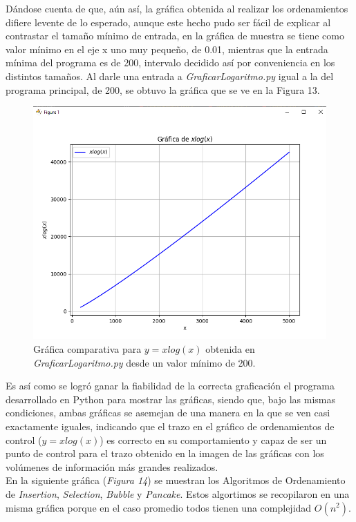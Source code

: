 \documentclass[a4paper,12pt]{article}
\begin{document}
Dándose cuenta de que, aún así, la gráfica obtenida al realizar los ordenamientos difiere levente de lo esperado, aunque este hecho pudo ser fácil de explicar al contrastar el tamaño mínimo de entrada, en la gráfica de muestra se tiene como valor mínimo en el eje x uno muy pequeño, de 0.01, mientras que la entrada mínima del programa es de 200, intervalo decidido así por conveniencia en los distintos tamaños. Al darle una entrada a \textit{GraficarLogaritmo.py} igual a la del programa principal, de 200, se obtuvo la gráfica que se ve en la Figura 13.

\begin{figure}[h]
    \centering
    \includegraphics[width=.8\textwidth]{media/xlogx_desde_200.png}
    \caption{Gráfica comparativa para $y=xlog(x)$ obtenida en \textit{GraficarLogaritmo.py} desde un valor mínimo de 200.}
    \label{fig:nlogn-python3}
\end{figure}

Es así como se logró ganar la fiabilidad de la correcta graficación el programa desarrollado en Python para mostrar las gráficas, siendo que, bajo las mismas condiciones, ambas gráficas se asemejan de una manera en la que se ven casi exactamente iguales, indicando que el trazo en el gráfico de ordenamientos de control ($y=xlog(x)$) es correcto en su comportamiento y capaz de ser un punto de control para el trazo obtenido en la imagen de las gráficas con los volúmenes de información más grandes realizados.\\

En la siguiente gráfica (\textit{Figura 14}) se muestran los Algoritmos de Ordenamiento de \textit{Insertion}, \textit{Selection}, \textit{Bubble} y \textit{Pancake}. Estos algortimos se recopilaron en una misma gráfica porque en el caso promedio todos tienen una complejidad $O(n^2)$.\\
\end{document}
